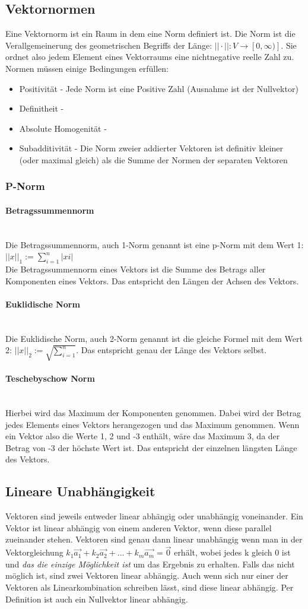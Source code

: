 \documentclass{article}
\newcommand{\paragraphlb}[1]{\paragraph{#1}\mbox{}\\}
\begin{document}
	\subsection{Vektornormen}
	Eine Vektornorm ist ein Raum in dem eine Norm definiert ist. Die Norm ist die Verallgemeinerung des geometrischen Begriffs der Länge: $||\cdot||:V\rightarrow [0, \infty)]$. Sie ordnet also jedem Element eines Vektorraums eine nichtnegative reelle Zahl zu. \\
	Normen müssen einige Bedingungen erfüllen:
	\begin{itemize}
		\item{Positivität - Jede Norm ist eine Positive Zahl (Ausnahme ist der Nullvektor)}
		\item{Definitheit - }
		\item{Absolute Homogenität - }
		\item{Subadditivität - Die Norm zweier addierter Vektoren ist definitiv kleiner (oder maximal gleich) als die Summe der Normen der separaten Vektoren}
	\end{itemize}
	\subsubsection{P-Norm}

	\paragraphlb{Betragssummennorm}
	Die Betragssummennorm, auch 1-Norm genannt ist eine p-Norm mit dem Wert 1: $||x||_1:=\sum_{i=1}^{n}|xi|$ \\
	Die Betragssummennorm eines Vektors ist die Summe des Betrags aller Komponenten eines Vektors. Das entspricht den Längen der Achsen des Vektors.
	\paragraphlb{Euklidische Norm}
	Die Euklidische Norm, auch 2-Norm genannt ist die gleiche Formel mit dem Wert 2: $||x||_2:=\sqrt{\sum_{i=1}^{n}}$. Das entspricht genau der Länge des Vektors selbst.
	\paragraphlb{Teschebyschow Norm}
	Hierbei wird das Maximum der Komponenten genommen. Dabei wird der Betrag jedes Elements eines Vektors herangezogen und das Maximum genommen. Wenn ein Vektor also die Werte 1, 2 und -3 enthält, wäre das Maximum 3, da der Betrag von -3 der höchste Wert ist. Das entspricht der einzelnen längsten Länge des Vektors.
	\subsection{Lineare Unabhängigkeit}
	Vektoren sind jeweils entweder linear abhängig oder unabhängig voneinander. Ein Vektor ist linear abhängig von einem anderen Vektor, wenn diese parallel zueinander stehen. Vektoren sind genau dann linear unabhängig wenn man in der Vektorgleichung $k_1 \overrightarrow{a_1}+k_2 \overrightarrow{a_2}+...+k_m \overrightarrow{a_m}=\vec{0}$ erhält, wobei jedes k gleich 0 ist und \textit{das die einzige Möglichkeit ist} um das Ergebnis zu erhalten. Falls das nicht möglich ist, sind zwei Vektoren linear abhängig. Auch wenn sich nur einer der Vektoren als Linearkombination schreiben lässt, sind diese linear abhängig. Per Definition ist auch ein Nullvektor linear abhängig.
\end{document}
